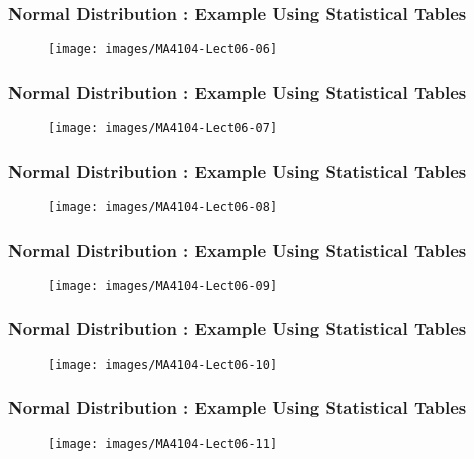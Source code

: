 \documentclass{beamer}
\begin{document}
	\begin{frame}
		\frametitle{Normal Distribution : Example Using Statistical Tables}
		\begin{figure}
			\centering
			\texttt{[image: images/MA4104-Lect06-06]}
			
		\end{figure}
	\end{frame}
	\begin{frame}
		\frametitle{Normal Distribution : Example Using Statistical Tables}
		\begin{figure}
			\centering	
			\texttt{[image: images/MA4104-Lect06-07]}
			
		\end{figure}
	\end{frame}
	\begin{frame}
		\frametitle{Normal Distribution : Example Using Statistical Tables}
		\begin{figure}
			\centering
			\texttt{[image: images/MA4104-Lect06-08]}
			
		\end{figure}
	\end{frame}
	\begin{frame}
		\frametitle{Normal Distribution : Example Using Statistical Tables}
		\begin{figure}
			\centering	
			\texttt{[image: images/MA4104-Lect06-09]}
			
		\end{figure}
	\end{frame}
	\begin{frame}
		\frametitle{Normal Distribution : Example Using Statistical Tables}
		\begin{figure}
			\centering
			\texttt{[image: images/MA4104-Lect06-10]}
			
		\end{figure}
	\end{frame}
	\begin{frame}
		\frametitle{Normal Distribution : Example Using Statistical Tables}
		\begin{figure}
			\centering
			\texttt{[image: images/MA4104-Lect06-11]}
			
		\end{figure}
	\end{frame}
\end{document}
